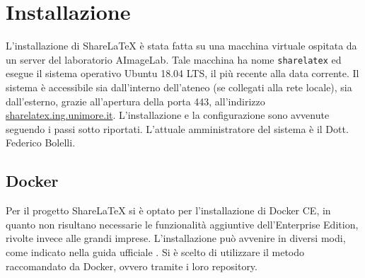\chapter{Installazione}
\label{Installazione}
\thispagestyle{empty}

L'installazione di ShareLaTeX è stata fatta su una macchina virtuale ospitata da un server del laboratorio AImageLab. Tale macchina ha nome \verb|sharelatex| ed esegue il sistema operativo Ubuntu 18.04 LTS, il più recente alla data corrente. Il sistema è accessibile sia dall'interno dell'ateneo (se collegati alla rete locale), sia dall'esterno, grazie all'apertura della porta 443, all'indirizzo \url{sharelatex.ing.unimore.it}. L'installazione e la configurazione sono avvenute seguendo i passi sotto riportati. L'attuale amministratore del sistema è il Dott. Federico Bolelli.

\section{Docker}
Per il progetto ShareLaTeX si è optato per l'installazione di Docker CE, in quanto non risultano necessarie le funzionalità aggiuntive dell'Enterprise Edition, rivolte invece alle grandi imprese. L'installazione può avvenire in diversi modi, come indicato nella guida ufficiale \cite{docker_install}. Si è scelto di utilizzare il metodo raccomandato da Docker, ovvero tramite i loro repository.

